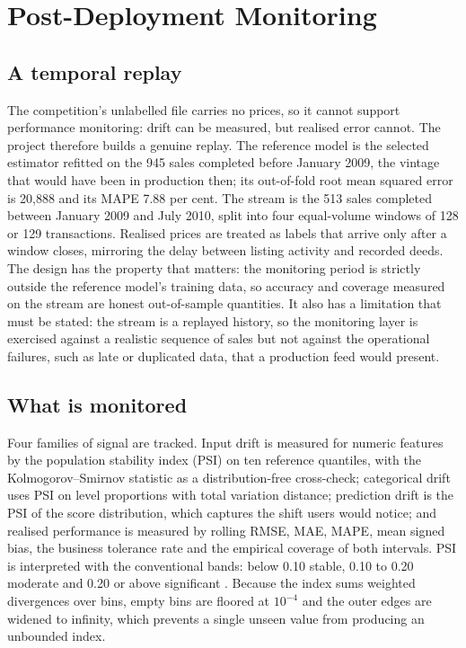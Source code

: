\section{Post-Deployment Monitoring}
\label{sec:monitoring}

\subsection{A temporal replay}

The competition's unlabelled file carries no prices, so it cannot support performance
monitoring: drift can be measured, but realised error cannot. The project therefore
builds a genuine replay. The reference model is the selected estimator refitted on the
945 sales completed before January 2009, the vintage that would have been in
production then; its out-of-fold root mean squared error is 20,888 \USD{} and its
MAPE 7.88 per cent. The stream is the 513 sales completed between January 2009 and
July 2010, split into four equal-volume windows of 128 or 129 transactions. Realised prices are treated as
labels that arrive only after a window closes, mirroring the delay between listing
activity and recorded deeds. The design has the property that matters: the monitoring
period is strictly outside the reference model's training data, so accuracy and
coverage measured on the stream are honest out-of-sample quantities. It also has a
limitation that must be stated: the stream is a replayed history, so the monitoring
layer is exercised against a realistic sequence of sales but not against the
operational failures, such as late or duplicated data, that a production feed would
present.

\subsection{What is monitored}

Four families of signal are tracked. Input drift is measured for numeric features by
the population stability index (PSI) on ten reference quantiles, with the
Kolmogorov--Smirnov statistic as a distribution-free cross-check; categorical drift
uses PSI on level proportions with total variation distance; prediction drift is the
PSI of the score distribution, which captures the shift users would notice; and
realised performance is measured by rolling RMSE, MAE, MAPE, mean signed bias, the
business tolerance rate and the empirical coverage of both intervals. PSI is
interpreted with the conventional bands: below 0.10 stable, 0.10 to 0.20 moderate and
0.20 or above significant \citep{siddiqi2006,yurdakul2018psi}. Because the index sums
weighted divergences over bins, empty bins are floored at $10^{-4}$ and the outer
edges are widened to infinity, which prevents a single unseen value from producing an
unbounded index.

